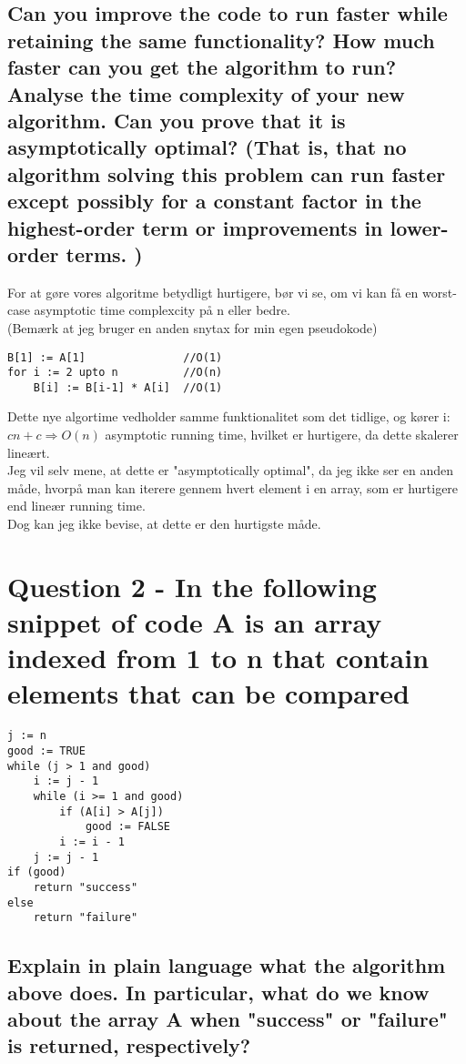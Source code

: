 \documentclass[a4paper,12pt]{article}
\begin{document}
\subsection[]{Can you improve the code to run faster while retaining the same functionality? How
much faster can you get the algorithm to run? Analyse the time complexity of your new
algorithm. Can you prove that it is asymptotically optimal? (That is, that no algorithm
solving this problem can run faster except possibly for a constant factor in the highest-order
term or improvements in lower-order terms. )}

For at gøre vores algoritme betydligt hurtigere, bør vi se, om vi kan få en worst-case asymptotic time complexcity på n eller bedre.\\
(Bemærk at jeg bruger en anden snytax for min egen pseudokode)
\begin{lstlisting}
B[1] := A[1]               //O(1)
for i := 2 upto n          //O(n)
    B[i] := B[i-1] * A[i]  //O(1)
\end{lstlisting} 
Dette nye algortime vedholder samme funktionalitet som det tidlige, og kører i: $cn + c \Rightarrow O(n)$ asymptotic running time, hvilket er hurtigere, da dette skalerer lineært.\\
Jeg vil selv mene, at dette er "asymptotically optimal", da jeg ikke ser en anden måde, hvorpå man kan iterere gennem hvert element i en array, som er hurtigere end lineær running time.\\
Dog kan jeg ikke bevise, at dette er den hurtigste måde.

\section[Question 2]{Question 2 - In the following snippet of code A is an array indexed from 1 to n that contain elements
that can be compared}

\begin{lstlisting}
j := n
good := TRUE
while (j > 1 and good)
    i := j - 1
    while (i >= 1 and good)
        if (A[i] > A[j])
            good := FALSE
        i := i - 1
    j := j - 1
if (good)
    return "success"
else
    return "failure"
\end{lstlisting}
    
\subsection[]{Explain in plain language what the algorithm above does. In particular, what do we know
about the array A when "success" or "failure" is returned, respectively?}
\end{document}
